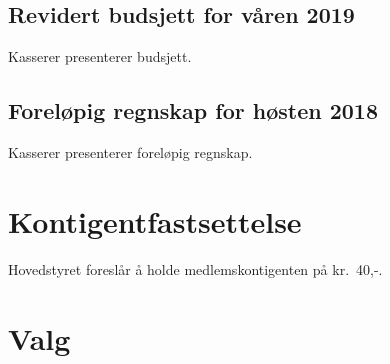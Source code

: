 \documentclass[10pt,norsk,a4paper]{article}
\begin{document}
\subsection{Revidert budsjett for våren 2019}
Kasserer presenterer budsjett.

\subsection{Foreløpig regnskap for høsten 2018}
Kasserer presenterer foreløpig regnskap.

\section{Kontigentfastsettelse}
Hovedstyret foreslår å holde medlemskontigenten på kr.~40,-.

\newpage

\section{Valg}
\end{document}
